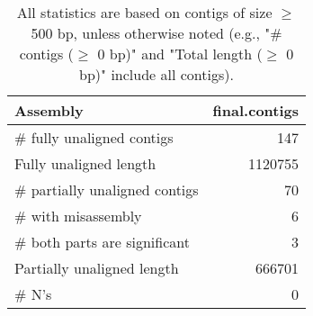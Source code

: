 \documentclass[12pt,a4paper]{article}
\begin{document}
\begin{table}[ht]
\begin{center}
\caption{All statistics are based on contigs of size $\geq$ 500 bp, unless otherwise noted (e.g., "\# contigs ($\geq$ 0 bp)" and "Total length ($\geq$ 0 bp)" include all contigs).}
\begin{tabular}{|l*{1}{|r}|}
\hline
Assembly & final.contigs \\ \hline
\# fully unaligned contigs & 147 \\ \hline
Fully unaligned length & 1120755 \\ \hline
\# partially unaligned contigs & 70 \\ \hline
\hspace{5mm}\# with misassembly & 6 \\ \hline
\hspace{5mm}\# both parts are significant & 3 \\ \hline
Partially unaligned length & 666701 \\ \hline
\# N's & 0 \\ \hline
\end{tabular}
\end{center}
\end{table}
\end{document}
